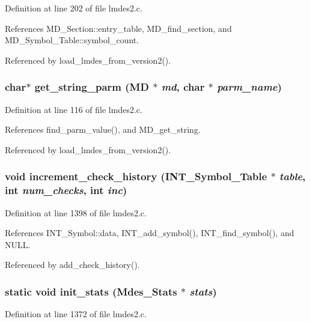 Definition at line 202 of file lmdes2.c.

References MD\_\-Section::entry\_\-table, MD\_\-find\_\-section, and MD\_\-Symbol\_\-Table::symbol\_\-count.

Referenced by load\_\-lmdes\_\-from\_\-version2().
\subsubsection{\setlength{\rightskip}{0pt plus 5cm}char$\ast$ get\_\-string\_\-parm (\bf{MD} $\ast$ {\em md}, char $\ast$ {\em parm\_\-name})}\label{lmdes2_8c_bbfde937235d598faa885cf283cec940}




Definition at line 116 of file lmdes2.c.

References find\_\-parm\_\-value(), and MD\_\-get\_\-string.

Referenced by load\_\-lmdes\_\-from\_\-version2().
\subsubsection{\setlength{\rightskip}{0pt plus 5cm}void increment\_\-check\_\-history (\bf{INT\_\-Symbol\_\-Table} $\ast$ {\em table}, int {\em num\_\-checks}, int {\em inc})}\label{lmdes2_8c_29f817af40da58d6d2d8154a3d6f425f}




Definition at line 1398 of file lmdes2.c.

References INT\_\-Symbol::data, INT\_\-add\_\-symbol(), INT\_\-find\_\-symbol(), and NULL.

Referenced by add\_\-check\_\-history().
\subsubsection{\setlength{\rightskip}{0pt plus 5cm}static void init\_\-stats (\bf{Mdes\_\-Stats} $\ast$ {\em stats})\hspace{0.3cm}{\tt  [static]}}\label{lmdes2_8c_78199cabec4aa12318cc0b82389c019e}




Definition at line 1372 of file lmdes2.c.

